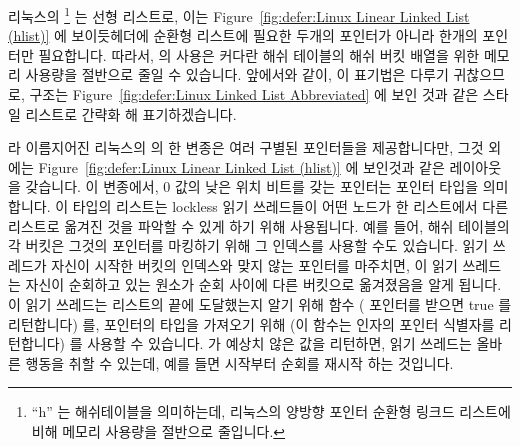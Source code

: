 리눅스의 \footnote{
	``h'' 는 해쉬테이블을 의미하는데, 리눅스의 양방향 포인터 순환형 링크드
	리스트에 비해 메모리 사용량을 절반으로 줄입니다.}
는 선형 리스트로, 이는
Figure~\ref{fig:defer:Linux Linear Linked List (hlist)}
에 보이듯헤더에  순환형 리스트에 필요한 두개의 포인터가 아니라 한개의 포인터만
필요합니다.
따라서,  의 사용은 커다란 해쉬 테이블의 해쉬 버킷 배열을 위한 메모리
사용량을 절반으로 줄일 수 있습니다.
앞에서와 같이, 이 표기법은 다루기 귀찮으므로,  구조는
Figure~\ref{fig:defer:Linux Linked List Abbreviated}
에 보인 것과 같은  스타일 리스트로 간략화 해 표기하겠습니다.

 라 이름지어진 리눅스의  의 한 변종은 여러 구별된
 포인터들을 제공합니다만, 그것 외에는
Figure~\ref{fig:defer:Linux Linear Linked List (hlist)}
에 보인것과 같은 레이아웃을 갖습니다.
이 변종에서, 0 값의 낮은 위치 비트를 갖는  포인터는  포인터
타입을 의미합니다.
이 타입의 리스트는 lockless 읽기 쓰레드들이 어떤 노드가 한 리스트에서 다른
리스트로 옮겨진 것을 파악할 수 있게 하기 위해 사용됩니다.
예를 들어, 해쉬 테이블의 각 버킷은 그것의  포인터를 마킹하기 위해 그
인덱스를 사용할 수도 있습니다.
읽기 쓰레드가 자신이 시작한 버킷의 인덱스와 맞지 않는  포인터를
마주치면, 이 읽기 쓰레드는 자신이 순회하고 있는 원소가 순회 사이에 다른
버킷으로 옮겨졌음을 알게 됩니다.
이 읽기 쓰레드는 리스트의 끝에 도달했는지 알기 위해  함수
(  포인터를 받으면 true 를 리턴합니다) 를, 
포인터의 타입을 가져오기 위해  (이 함수는 인자의
 포인터 식별자를 리턴합니다) 를 사용할 수 있습니다.
 가 예상치 않은 값을 리턴하면, 읽기 쓰레드는 올바른
행동을 취할 수 있는데, 예를 들면 시작부터 순회를 재시작 하는 것입니다.

